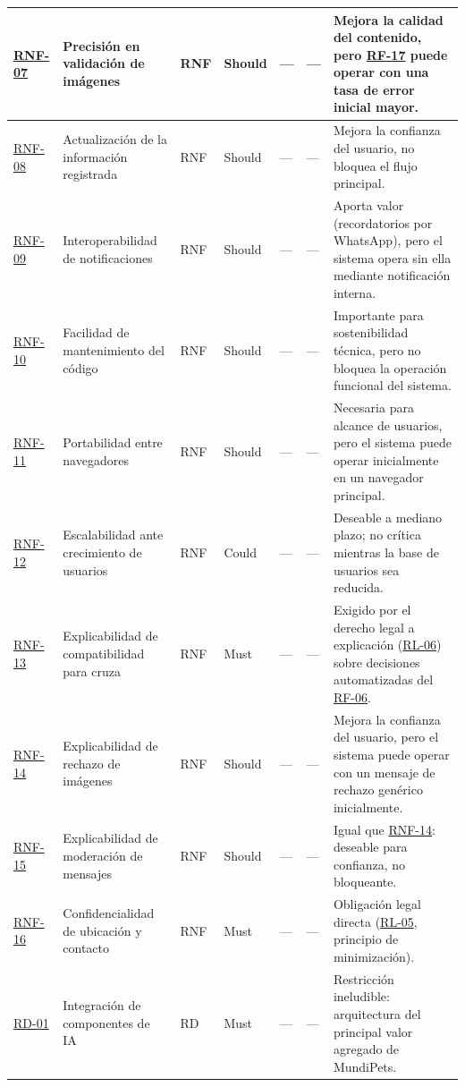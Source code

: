 \documentclass[journal,onecolumn]{IEEEtran}
\begin{document}
\begin{landscape}
\begin{longtable}{@{}p{1.2cm} p{5.2cm} p{1.0cm} p{1.3cm} p{1.3cm} p{1.1cm} p{6.5cm}@{}}
			\hyperref[tab:RNF-07]{RNF-07} & Precisión en validación de imágenes & RNF & Should & --- & --- & Mejora la calidad del contenido, pero \hyperref[tab:RF-17]{RF-17} puede operar con una tasa de error inicial mayor. \\ \midrule
			\hyperref[tab:RNF-08]{RNF-08} & Actualización de la información registrada & RNF & Should & --- & --- & Mejora la confianza del usuario, no bloquea el flujo principal. \\ \midrule
			\hyperref[tab:RNF-09]{RNF-09} & Interoperabilidad de notificaciones & RNF & Should & --- & --- & Aporta valor (recordatorios por WhatsApp), pero el sistema opera sin ella mediante notificación interna. \\ \midrule
			\hyperref[tab:RNF-10]{RNF-10} & Facilidad de mantenimiento del código & RNF & Should & --- & --- & Importante para sostenibilidad técnica, pero no bloquea la operación funcional del sistema. \\ \midrule
			\hyperref[tab:RNF-11]{RNF-11} & Portabilidad entre navegadores & RNF & Should & --- & --- & Necesaria para alcance de usuarios, pero el sistema puede operar inicialmente en un navegador principal. \\ \midrule
			\hyperref[tab:RNF-12]{RNF-12} & Escalabilidad ante crecimiento de usuarios & RNF & Could & --- & --- & Deseable a mediano plazo; no crítica mientras la base de usuarios sea reducida. \\ \midrule
			\hyperref[tab:RNF-13]{RNF-13} & Explicabilidad de compatibilidad para cruza & RNF & Must & --- & --- & Exigido por el derecho legal a explicación (\hyperref[rl:06]{RL-06}) sobre decisiones automatizadas del \hyperref[tab:RF-06]{RF-06}. \\ \midrule
			\hyperref[tab:RNF-14]{RNF-14} & Explicabilidad de rechazo de imágenes & RNF & Should & --- & --- & Mejora la confianza del usuario, pero el sistema puede operar con un mensaje de rechazo genérico inicialmente. \\ \midrule
			\hyperref[tab:RNF-15]{RNF-15} & Explicabilidad de moderación de mensajes & RNF & Should & --- & --- & Igual que \hyperref[tab:RNF-14]{RNF-14}: deseable para confianza, no bloqueante. \\ \midrule
			\hyperref[tab:RNF-16]{RNF-16} & Confidencialidad de ubicación y contacto & RNF & Must & --- & --- & Obligación legal directa (\hyperref[rl:05]{RL-05}, principio de minimización). \\ \midrule
			\hyperref[tab:RD-01]{RD-01} & Integración de componentes de IA & RD & Must & --- & --- & Restricción ineludible: arquitectura del principal valor agregado de MundiPets. \\ \midrule

\end{longtable}
\end{landscape}
\end{document}
